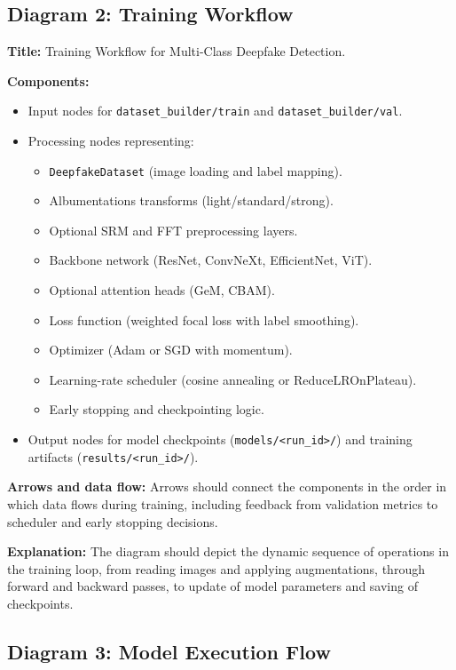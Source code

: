 \subsection*{Diagram 2: Training Workflow}

\textbf{Title:} Training Workflow for Multi-Class Deepfake Detection.

\textbf{Components:}
\begin{itemize}
  \item Input nodes for \texttt{dataset\_builder/train} and \texttt{dataset\_builder/val}.
  \item Processing nodes representing:
  \begin{itemize}
    \item \texttt{DeepfakeDataset} (image loading and label mapping).
    \item Albumentations transforms (light/standard/strong).
    \item Optional SRM and FFT preprocessing layers.
    \item Backbone network (ResNet, ConvNeXt, EfficientNet, ViT).
    \item Optional attention heads (GeM, CBAM).
    \item Loss function (weighted focal loss with label smoothing).
    \item Optimizer (Adam or SGD with momentum).
    \item Learning-rate scheduler (cosine annealing or ReduceLROnPlateau).
    \item Early stopping and checkpointing logic.
  \end{itemize}
  \item Output nodes for model checkpoints (\texttt{models/\textless run\_id\textgreater/}) and training artifacts (\texttt{results/\textless run\_id\textgreater/}).
\end{itemize}

\textbf{Arrows and data flow:} Arrows should connect the components in the order in which data flows during training, including feedback from validation metrics to scheduler and early stopping decisions.

\textbf{Explanation:} The diagram should depict the dynamic sequence of operations in the training loop, from reading images and applying augmentations, through forward and backward passes, to update of model parameters and saving of checkpoints.

\subsection*{Diagram 3: Model Execution Flow}

